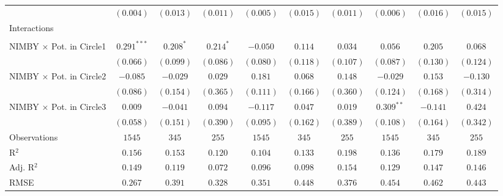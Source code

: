 \begin{center}
\begin{small}
\begin{longtable}{l@{} c@{} c@{} c@{} c@{} c@{} c@{} c@{} c@{} c@{}}
                                    & $(0.004)$       & $(0.013)$        & $(0.011)$   & $(0.005)$      & $(0.015)$    & $(0.011)$        & $(0.006)$       & $(0.016)$       & $(0.015)$       \\
Interactions                        &                 &                  &             &                &              &                  &                 &                 &                 \\
                                    &                 &                  &             &                &              &                  &                 &                 &                 \\
\quad NIMBY × Pot. in Circle1       & $0.291^{***}$   & $0.208^{*}$      & $0.214^{*}$ & $-0.050$       & $0.114$      & $0.034$          & $0.056$         & $0.205$         & $0.068$         \\
                                    & $(0.066)$       & $(0.099)$        & $(0.086)$   & $(0.080)$      & $(0.118)$    & $(0.107)$        & $(0.087)$       & $(0.130)$       & $(0.124)$       \\
\quad NIMBY × Pot. in Circle2       & $-0.085$        & $-0.029$         & $0.029$     & $0.181$        & $0.068$      & $0.148$          & $-0.029$        & $0.153$         & $-0.130$        \\
                                    & $(0.086)$       & $(0.154)$        & $(0.365)$   & $(0.111)$      & $(0.166)$    & $(0.360)$        & $(0.124)$       & $(0.168)$       & $(0.314)$       \\
\quad NIMBY × Pot. in Circle3       & $0.009$         & $-0.041$         & $0.094$     & $-0.117$       & $0.047$      & $0.019$          & $0.309^{**}$    & $-0.141$        & $0.424$         \\
                                    & $(0.058)$       & $(0.151)$        & $(0.390)$   & $(0.095)$      & $(0.162)$    & $(0.389)$        & $(0.108)$       & $(0.164)$       & $(0.342)$       \\
\hline
Observations                        & $1545$          & $345$            & $255$       & $1545$         & $345$        & $255$            & $1545$          & $345$           & $255$           \\
R$^2$                               & $0.156$         & $0.153$          & $0.120$     & $0.104$        & $0.133$      & $0.198$          & $0.136$         & $0.179$         & $0.189$         \\
Adj. R$^2$                          & $0.149$         & $0.119$          & $0.072$     & $0.096$        & $0.098$      & $0.154$          & $0.129$         & $0.147$         & $0.146$         \\
RMSE                                & $0.267$         & $0.391$          & $0.328$     & $0.351$        & $0.448$      & $0.376$          & $0.454$         & $0.462$         & $0.443$         \\
\end{longtable}
\end{small}
\end{center}
